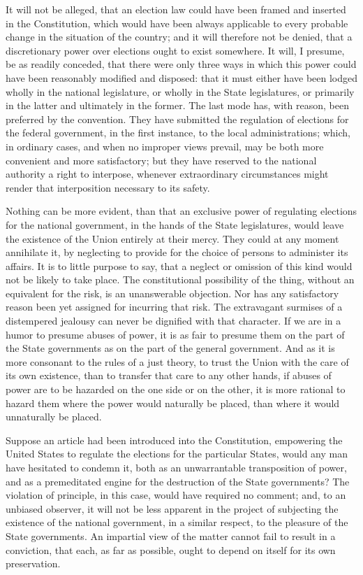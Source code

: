 It will not be alleged, that an election law could have been framed and inserted in the Constitution, which would have been always applicable to every probable change in the situation of the country; and it will therefore not be denied, that a discretionary power over elections ought to exist somewhere. 
It will, I presume, be as readily conceded, that there were only three ways in which this power could have been reasonably modified and disposed: that it must either have been lodged wholly in the national legislature, or wholly in the State legislatures, or primarily in the latter and ultimately in the former. 
The last mode has, with reason, been preferred by the convention. 
They have submitted the regulation of elections for the federal government, in the first instance, to the local administrations; which, in ordinary cases, and when no improper views prevail, may be both more convenient and more satisfactory; but they have reserved to the national authority a right to interpose, whenever extraordinary circumstances might render that interposition necessary to its safety.

Nothing can be more evident, than that an exclusive power of regulating elections for the national government, in the hands of the State legislatures, would leave the existence of the Union entirely at their mercy. 
They could at any moment annihilate it, by neglecting to provide for the choice of persons to administer its affairs. 
It is to little purpose to say, that a neglect or omission of this kind would not be likely to take place. 
The constitutional possibility of the thing, without an equivalent for the risk, is an unanswerable objection. 
Nor has any satisfactory reason been yet assigned for incurring that risk. 
The extravagant surmises of a distempered jealousy can never be dignified with that character. 
If we are in a humor to presume abuses of power, it is as fair to presume them on the part of the State governments as on the part of the general government. 
And as it is more consonant to the rules of a just theory, to trust the Union with the care of its own existence, than to transfer that care to any other hands, if abuses of power are to be hazarded on the one side or on the other, it is more rational to hazard them where the power would naturally be placed, than where it would unnaturally be placed.

Suppose an article had been introduced into the Constitution, empowering the United States to regulate the elections for the particular States, would any man have hesitated to condemn it, both as an unwarrantable transposition of power, and as a premeditated engine for the destruction of the State governments? 
The violation of principle, in this case, would have required no comment; and, to an unbiased observer, it will not be less apparent in the project of subjecting the existence of the national government, in a similar respect, to the pleasure of the State governments. 
An impartial view of the matter cannot fail to result in a conviction, that each, as far as possible, ought to depend on itself for its own preservation.


